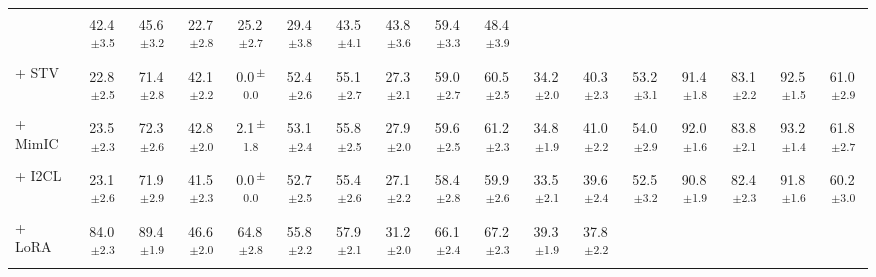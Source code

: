 \documentclass[sigconf,review,anonymous,9pt,table]{acmart}
\begin{document}
\begin{table}[t]
{\begin{tabular}{@{}l
  c c
  c c c c c
  c c c c
  c c c c c
  @{}}
  & 42.4\textsuperscript{\,$\pm$3.5} & 45.6\textsuperscript{\,$\pm$3.2} & 22.7\textsuperscript{\,$\pm$2.8} & 25.2\textsuperscript{\,$\pm$2.7}
  & 29.4\textsuperscript{\,$\pm$3.8} & 43.5\textsuperscript{\,$\pm$4.1} & 43.8\textsuperscript{\,$\pm$3.6} & 59.4\textsuperscript{\,$\pm$3.3} & 48.4\textsuperscript{\,$\pm$3.9} \\
+ STV~\cite{ma2026and}
  & 22.8\textsuperscript{\,$\pm$2.5} & 71.4\textsuperscript{\,$\pm$2.8} & 42.1\textsuperscript{\,$\pm$2.2} & 0.0\textsuperscript{\,$\pm$0.0} & 52.4\textsuperscript{\,$\pm$2.6} & 55.1\textsuperscript{\,$\pm$2.7} & 27.3\textsuperscript{\,$\pm$2.1}
  & 59.0\textsuperscript{\,$\pm$2.7} & 60.5\textsuperscript{\,$\pm$2.5} & 34.2\textsuperscript{\,$\pm$2.0} & 40.3\textsuperscript{\,$\pm$2.3}
  & 53.2\textsuperscript{\,$\pm$3.1} & 91.4\textsuperscript{\,$\pm$1.8} & 83.1\textsuperscript{\,$\pm$2.2} & 92.5\textsuperscript{\,$\pm$1.5} & 61.0\textsuperscript{\,$\pm$2.9} \\
+ MimIC~\cite{jiang2025mimic}
  & 23.5\textsuperscript{\,$\pm$2.3} & 72.3\textsuperscript{\,$\pm$2.6} & 42.8\textsuperscript{\,$\pm$2.0} & 2.1\textsuperscript{\,$\pm$1.8} & 53.1\textsuperscript{\,$\pm$2.4} & 55.8\textsuperscript{\,$\pm$2.5} & 27.9\textsuperscript{\,$\pm$2.0}
  & 59.6\textsuperscript{\,$\pm$2.5} & 61.2\textsuperscript{\,$\pm$2.3} & 34.8\textsuperscript{\,$\pm$1.9} & 41.0\textsuperscript{\,$\pm$2.2}
  & 54.0\textsuperscript{\,$\pm$2.9} & 92.0\textsuperscript{\,$\pm$1.6} & 83.8\textsuperscript{\,$\pm$2.1} & 93.2\textsuperscript{\,$\pm$1.4} & 61.8\textsuperscript{\,$\pm$2.7} \\
+ I2CL~\cite{li2025implicit}
  & 23.1\textsuperscript{\,$\pm$2.6} & 71.9\textsuperscript{\,$\pm$2.9} & 41.5\textsuperscript{\,$\pm$2.3} & 0.0\textsuperscript{\,$\pm$0.0} & 52.7\textsuperscript{\,$\pm$2.5} & 55.4\textsuperscript{\,$\pm$2.6} & 27.1\textsuperscript{\,$\pm$2.2}
  & 58.4\textsuperscript{\,$\pm$2.8} & 59.9\textsuperscript{\,$\pm$2.6} & 33.5\textsuperscript{\,$\pm$2.1} & 39.6\textsuperscript{\,$\pm$2.4}
  & 52.5\textsuperscript{\,$\pm$3.2} & 90.8\textsuperscript{\,$\pm$1.9} & 82.4\textsuperscript{\,$\pm$2.3} & 91.8\textsuperscript{\,$\pm$1.6} & 60.2\textsuperscript{\,$\pm$3.0} \\
+ LoRA~\cite{hu2022lora}
  & 84.0\textsuperscript{\,$\pm$2.3} & 89.4\textsuperscript{\,$\pm$1.9} & 46.6\textsuperscript{\,$\pm$2.0} & 64.8\textsuperscript{\,$\pm$2.8} & 55.8\textsuperscript{\,$\pm$2.2} & 57.9\textsuperscript{\,$\pm$2.1} & 31.2\textsuperscript{\,$\pm$2.0}
  & 66.1\textsuperscript{\,$\pm$2.4} & 67.2\textsuperscript{\,$\pm$2.3} & 39.3\textsuperscript{\,$\pm$1.9} & 37.8\textsuperscript{\,$\pm$2.2}

\end{tabular}}
\end{table}
\end{document}
